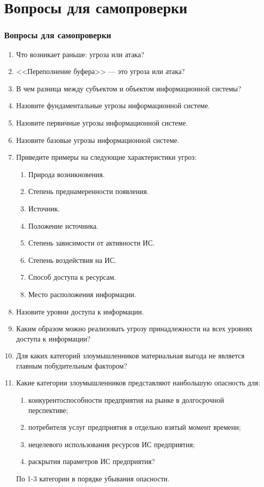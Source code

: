 \appendix


\section{Вопросы для самопроверки}


\begin{frame}[allowframebreaks]
    \frametitle{Вопросы для самопроверки}

    \begin{enumerate}
        \item Что возникает раньше: угроза или атака?
        \item{} <<Переполнение буфера>> --- это угроза или атака?
        \item В чем разница между субъектом и объектом информационной системы?
        \item Назовите фундаментальные угрозы информационной системе.
        \item Назовите первичные угрозы информационной системе.
        \item Назовите базовые угрозы информационной системе.
        \item Приведите примеры на следующие характеристики угроз:
        \begin{enumerate}
            \item Природа возникновения.
            \item Степень преднамеренности появления.
            \item Источник.
            \item Положение источника.
            \item Степень зависимости от активности ИС.
            \item Степень воздействия на ИС.
            \item Способ доступа к ресурсам.
            \item Место расположения информации.
        \end{enumerate}
        \item Назовите уровни доступа к информации.
        \item Каким образом можно реализовать угрозу принадлежности на всех уровнях доступа к информации?
        \item Для каких категорий злоумышленников материальная выгода не является главным побудительным фактором?
        \item Какие категории злоумышленников представляют наибольшую опасность для:
        \begin{enumerate}
            \item конкурентоспособности предприятия на рынке в долгосрочной перспективе;
            \item потребителя услуг предприятия в отдельно взятый момент времени;
            \item нецелевого использования ресурсов ИС предприятия;
            \item раскрытия параметров ИС предприятия?
        \end{enumerate}
        По 1-3 категории в порядке убывания опасности.
    \end{enumerate}
\end{frame}


